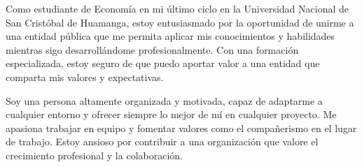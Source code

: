 \par{
    Como estudiante de Economía en mi último ciclo en la Universidad Nacional de San Cristóbal de Huamanga, estoy entusiasmado por la oportunidad de unirme a una entidad pública que me permita aplicar mis conocimientos y habilidades mientras sigo desarrollándome profesionalmente. Con una formación especializada, estoy seguro de que puedo aportar valor a una entidad que comparta mis valores y expectativas.

    Soy una persona altamente organizada y motivada, capaz de adaptarme a cualquier entorno y ofrecer siempre lo mejor de mí en cualquier proyecto. Me apasiona trabajar en equipo y fomentar valores como el compañerismo en el lugar de trabajo. Estoy ansioso por contribuir a una organización que valore el crecimiento profesional y la colaboración.










}